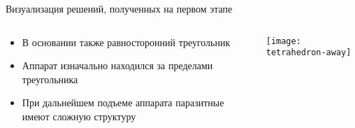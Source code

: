 \documentclass[russian,hyperref={unicode}]{beamer}
\begin{document}
  \begin{frame}{Визуализация решений, полученных на первом этапе}
    \begin{columns}[c]
      \begin{column}{.5\textwidth}
        \begin{itemize}
          \item В основании также равносторонний треугольник
          \item Аппарат изначально находился за пределами треугольника
          \item При дальнейшем подъеме аппарата паразитные имеют
                сложную структуру
        \end{itemize}
      \end{column}
      \begin{column}{.5\textwidth}
        \begin{center}
          \texttt{[image: tetrahedron-away]}
        \end{center}
      \end{column}
    \end{columns}
  \end{frame}
\end{document}
